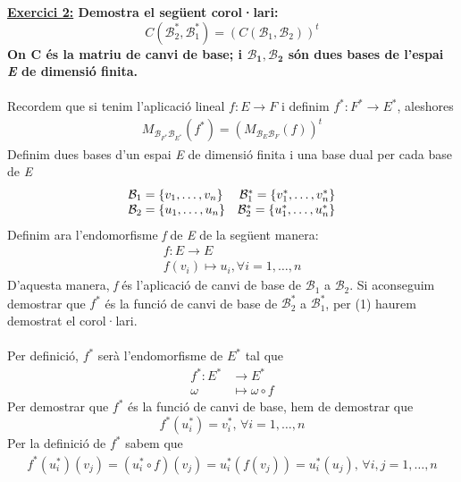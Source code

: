 \documentclass[a4paper, 11pt]{article}
\begin{document}
    \noindent\textbf{\large \underline{Exercici 2:} \normalsize Demostra el seg\"uent corol·lari:
    $$
        C(\mathcal{B}^*_2, \mathcal{B}^*_1) = \left( C(\mathcal{B}_1, \mathcal{B}_2) \right)^t
    $$
    On C \'es la matriu de canvi de base; i $\mathbf{\mathcal{B}_1, \mathcal{B}_2}$ s\'on dues bases de l'espai \emph{E} de dimensi\'o finita.
    }\\\\
    Recordem que si tenim l'aplicaci\'o lineal $f:E \longrightarrow F$ i definim $ f^*: F^* \longrightarrow E^* $, aleshores
    \begin{gather}
        M_{\mathcal{B}_{F^*}\mathcal{B}_{E^*}}(f^*) = \left( M_{\mathcal{B}_E\mathcal{B}_F}(f) \right)^t
    \end{gather}
    Definim dues bases d'un espai \emph{E} de dimensi\'o finita i una base dual per cada base de \emph{E}
    $$
        \begin{array}{l r}
            \mathcal{B}_1 = \left\{ v_1,\dots,v_n \right\} & \mathcal{B}^*_1 = \left\{ v^*_1,\dots,v^*_n \right\}\\
            \mathcal{B}_2 = \left\{ u_1,\dots,u_n \right\} & \mathcal{B}^*_2 = \left\{ u^*_1,\dots,u^*_n \right\}
        \end{array}
    $$
    Definim ara l'endomorfisme \emph{f} de \emph{E} de la seg\"uent manera:
    \begin{gather*}
        f: E \longrightarrow E\\
        f(v_i) \mapsto u_i, \forall i = 1,\dots,n
    \end{gather*}
    D'aquesta manera, \emph{f} \'es l'aplicaci\'o de canvi de base de $\mathcal{B}_1$ a $\mathcal{B}_2$. Si aconseguim demostrar que $ f^* $ \'es la funci\'o de canvi de base de $ \mathcal{B}^*_2 $ a $ \mathcal{B}^*_1 $, per (1) haurem demostrat el corol·lari.\\\\
    Per definici\'o, $ f^* $ ser\`a l'endomorfisme de $ E^* $ tal que
    \begin{align*}
        f^*: E^* &\longrightarrow E^*\\
        \omega &\mapsto \omega \circ f
    \end{align*}
    Per demostrar que $ f^* $ \'es la funci\'o de canvi de base, hem de demostrar que
    $$
        f^*(u^*_i) = v^*_i \text{, } \forall i = 1,\dots,n
    $$
    Per la definici\'o de $ f^* $ sabem que
    \begin{gather}
            f^*(u^*_i)(v_j) = (u^*_i \circ f)(v_j) =
            u^*_i(f(v_j)) = u^*_i(u_j)\text{, } \forall i,j = 1, \dots, n
    \end{gather}
\end{document}
